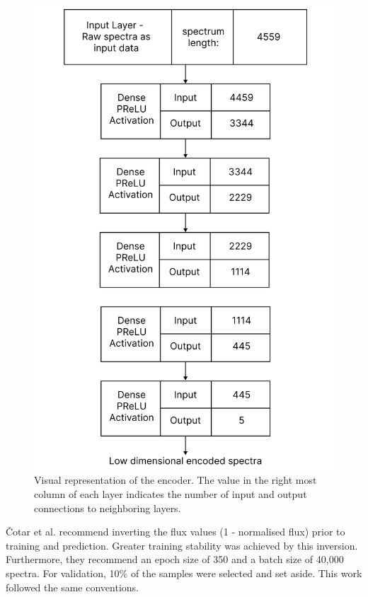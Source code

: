 \begin{figure}[!htb]
\centering
\includegraphics[scale=0.13]{figures/autoencoder diagram.png}
\caption{Visual representation of the encoder. The value in
the right most column of each layer indicates the number of input and output
connections to neighboring layers.}
\end{figure}

Čotar et al. recommend inverting the flux values (1 - normalised flux) prior to training and prediction. Greater training stability was achieved by this inversion. Furthermore, they recommend an epoch size of 350 and a batch size of 40,000 spectra. For validation, 10\% of the samples were selected and set aside. This work followed the same conventions. 


